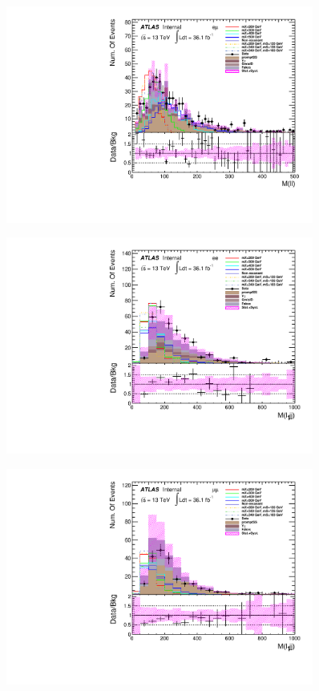 \begin{figure}[h]
\begin{minipage}[t]{0.33\linewidth}
 \label{fig:dataMC_high_Njet_CR:m_ll_mumu.pdf}
 \end{minipage}
 \begin{minipage}[t]{0.33\linewidth}
 \centering
 \includegraphics[width=0.9\textwidth,angle=-90]{fig/dataMC_high_Njet_CR/m_ll_emu.pdf}
 \label{fig:dataMC_high_Njet_CR:m_ll_emu.pdf}
 \end{minipage}
\begin{minipage}[t]{0.33\linewidth}
 \centering
 \includegraphics[width=0.9\textwidth,angle=-90]{fig/dataMC_high_Njet_CR/m_l1jj_ee.pdf}\label{fig:dataMC_high_Njet_CR:m_l1jj_ee.pdf}
 \end{minipage}
  \begin{minipage}[t]{0.33\linewidth}
 \centering
 \includegraphics[width=0.9\textwidth,angle=-90]{fig/dataMC_high_Njet_CR/m_l1jj_mumu.pdf}\label{fig:dataMC_high_Njet_CR:m_l1jj_mumu.pdf}

\end{minipage}
\end{figure}
